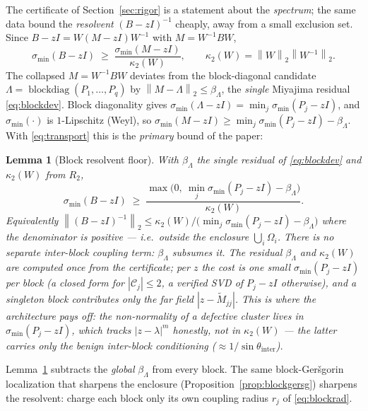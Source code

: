 \documentclass[11pt,a4paper]{article}
\newcommand{\norm}[1]{\left\|#1\right\|}
\newcommand{\abs}[1]{\left|#1\right|}
\theoremstyle{plain}
\newtheorem{lemma}[theorem]{Lemma}
\theoremstyle{definition}
\begin{document}
The certificate of Section~\ref{sec:rigor} is a statement about the \emph{spectrum};
the same data bound the \emph{resolvent} $(B-zI)^{-1}$ cheaply, away from a small
exclusion set. Since $B-zI = W(M-zI)W^{-1}$ with $M=W^{-1}BW$,
\begin{equation}\label{eq:transport}
  \sigma_{\min}(B-zI)\;\ge\;\frac{\sigma_{\min}(M-zI)}{\kappa_2(W)},
  \qquad \kappa_2(W)=\norm{W}_2\norm{W^{-1}}_2 .
\end{equation}
The collapsed $M=W^{-1}BW$ deviates from the block-diagonal candidate
$\Lambda=\operatorname{blockdiag}(P_1,\dots,P_q)$ by $\norm{M-\Lambda}_2\le\beta_\Lambda$,
the \emph{single} Miyajima residual \eqref{eq:blockdev}. Block diagonality gives
$\sigma_{\min}(\Lambda-zI)=\min_j\sigma_{\min}(P_j-zI)$, and $\sigma_{\min}(\cdot)$ is
$1$-Lipschitz (Weyl), so $\sigma_{\min}(M-zI)\ge\min_j\sigma_{\min}(P_j-zI)-\beta_\Lambda$.
With \eqref{eq:transport} this is the \emph{primary} bound of the paper:

\begin{lemma}[Block resolvent floor]\label{lem:blockres}
With $\beta_\Lambda$ the single residual of \eqref{eq:blockdev} and $\kappa_2(W)$ from $R_2$,
\[
  \sigma_{\min}(B-zI)\;\ge\;
  \frac{\max\big(0,\ \min_j\sigma_{\min}(P_j-zI)-\beta_\Lambda\big)}{\kappa_2(W)} .
\]
Equivalently $\norm{(B-zI)^{-1}}_2\le\kappa_2(W)\big/\big(\min_j\sigma_{\min}(P_j-zI)-\beta_\Lambda\big)$
where the denominator is positive --- i.e.\ outside the enclosure $\bigcup_i\Omega_i$. There
is no separate inter-block coupling term: $\beta_\Lambda$ subsumes it. The residual
$\beta_\Lambda$ and $\kappa_2(W)$ are computed once from the certificate; per $z$ the cost is one small
$\sigma_{\min}(P_j-zI)$ per block (a closed form for $\abs{\mathcal C_j}\le2$, a verified
SVD of $P_j-zI$ otherwise), and a singleton block contributes only the far field
$\abs{z-\widetilde M_{jj}}$. This is where the architecture pays off: the non-normality of a
defective cluster lives in $\sigma_{\min}(P_j-zI)$, which tracks $\abs{z-\lambda}^m$
honestly, \emph{not} in $\kappa_2(W)$ --- the latter carries only the benign inter-block
conditioning ($\approx1/\sin\theta_{\mathrm{inter}}$).
\end{lemma}

Lemma~\ref{lem:blockres} subtracts the \emph{global} $\beta_\Lambda$ from every block. The
same block-Ger\v sgorin localization that sharpens the enclosure (Proposition~\ref{prop:blockgersg})
sharpens the resolvent: charge each block only its own coupling radius $r_j$ of
\eqref{eq:blockrad}.
\end{document}
